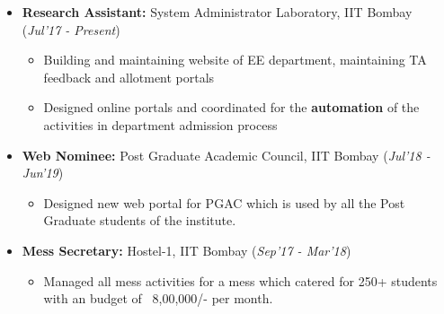 \documentclass[10pt]{article}
\begin{document}
\colorbox{bl}{}

\begin{itemize}[leftmargin=0.4cm]
\vspace{-0.2cm}

\item \textbf {Research Assistant:} System Administrator Laboratory, IIT Bombay \hfill{(\textit{Jul'17 - Present})}\\[-0.7cm]
        \begin{itemize}
	\item Building and maintaining website of EE department, maintaining TA feedback and allotment portals\vspace{-0.1cm}
	\item Designed online portals and coordinated for the \textbf{automation} of the activities in department admission process
	\end{itemize}
	\vspace{-0.3cm}


\item \textbf{Web Nominee:} Post Graduate Academic Council, IIT Bombay \hfill{(\textit{Jul'18 - Jun'19})}\\[-0.65cm]
\begin{itemize}
\item Designed new web portal for PGAC which is used by all the Post Graduate students of the institute. \vspace{-0.25cm}	

\end{itemize}
			
\item \textbf{Mess Secretary:
 }  Hostel-1, IIT Bombay   \hfill{(\textit{Sep'17 - Mar'18})}\\[-0.65cm]
 \begin{itemize}
\item Managed all mess activities for a mess which catered for 250+ students with an budget of ~8,00,000/- per month. \vspace{-0.25cm}	

\end{itemize}

\vspace{-0.05cm}
\end{itemize}
\end{document}

